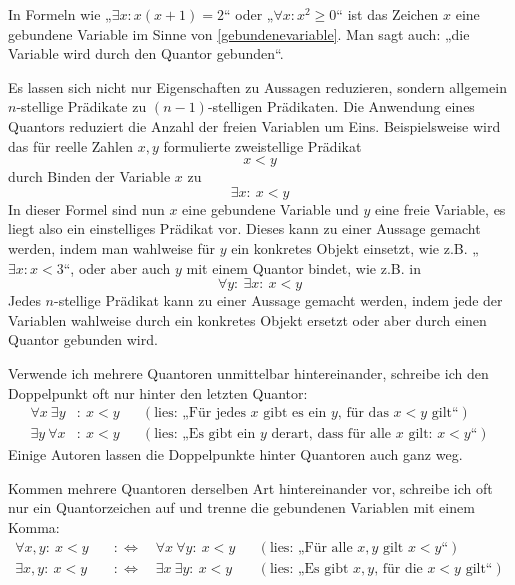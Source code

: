 \begin{bem} \label{quantorbindung}
    In Formeln wie „$\exists x: x(x+1)=2$“ oder „$\forall x: x^2\ge 0$“ ist das Zeichen $x$ eine gebundene Variable im Sinne von \cref{gebundenevariable}. Man sagt auch: „die Variable wird durch den Quantor gebunden“.

    Es lassen sich nicht nur Eigenschaften zu Aussagen reduzieren, sondern allgemein $n$-stellige Prädikate zu $(n-1)$-stelligen Prädikaten. Die Anwendung eines Quantors reduziert die Anzahl der freien Variablen um Eins. Beispielsweise wird das für reelle Zahlen $x,y$ formulierte zweistellige Prädikat
        \[ x < y \]
    durch Binden der Variable $x$ zu
        \[ \exists x:\ x<y \]
    In dieser Formel sind nun $x$ eine gebundene Variable und $y$ eine freie Variable, es liegt also ein einstelliges Prädikat vor. Dieses kann zu einer Aussage gemacht werden, indem man wahlweise für $y$ ein konkretes Objekt einsetzt, wie z.B. „$\exists x: x < 3$“, oder aber auch $y$ mit einem Quantor bindet, wie z.B. in
        \[ \forall y:\ \exists x:\ x < y \]
    Jedes $n$-stellige Prädikat kann zu einer Aussage gemacht werden, indem jede der Variablen wahlweise durch ein konkretes Objekt ersetzt oder aber durch einen Quantor gebunden wird.
\end{bem}
 
 
\begin{nota}
    Verwende ich mehrere Quantoren unmittelbar hintereinander, schreibe ich den Doppelpunkt oft nur hinter den letzten Quantor:
    \begin{align*}
        \forall x\ \exists y &:\ x < y && (\text{lies: „Für jedes $x$ gibt es ein $y$, für das $x<y$ gilt“}) \\
        \exists y\ \forall x &:\ x < y && (\text{lies: „Es gibt ein $y$ derart, dass für alle $x$ gilt: $x<y$“})
    \end{align*}
    Einige Autoren lassen die Doppelpunkte hinter Quantoren auch ganz weg.
    
    Kommen mehrere Quantoren derselben Art hintereinander vor, schreibe ich oft nur ein Quantorzeichen auf und trenne die gebundenen Variablen mit einem Komma:
    \begin{align*}
        \forall x,y:\ x<y \quad&:\Leftrightarrow\quad \forall x\ \forall y:\ x<y && (\text{lies: „Für alle $x,y$ gilt $x<y$“}) \\
        \exists x,y:\ x<y \quad&:\Leftrightarrow\quad \exists x\ \exists y:\ x<y && (\text{lies: „Es gibt $x,y$, für die $x<y$ gilt“})
    \end{align*}
\end{nota}

